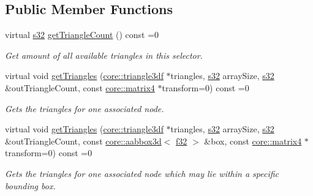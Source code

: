 \subsection*{Public Member Functions}
\begin{DoxyCompactItemize}
\item 
\mbox{\label{classirr_1_1scene_1_1ITriangleSelector_a0db5d5c5c9df15c41c00db40c692fcc6}} 
virtual \hyperlink{namespaceirr_ac66849b7a6ed16e30ebede579f9b47c6}{s32} \hyperlink{classirr_1_1scene_1_1ITriangleSelector_a0db5d5c5c9df15c41c00db40c692fcc6}{get\+Triangle\+Count} () const =0
\begin{DoxyCompactList}\small\item\em Get amount of all available triangles in this selector. \end{DoxyCompactList}\item 
virtual void \hyperlink{classirr_1_1scene_1_1ITriangleSelector_a63b547218902d57a44357d3a246e5070}{get\+Triangles} (\hyperlink{namespaceirr_1_1core_a1112835405bbec5dadf031dc7934e7d0}{core\+::triangle3df} $\ast$triangles, \hyperlink{namespaceirr_ac66849b7a6ed16e30ebede579f9b47c6}{s32} array\+Size, \hyperlink{namespaceirr_ac66849b7a6ed16e30ebede579f9b47c6}{s32} \&out\+Triangle\+Count, const \hyperlink{namespaceirr_1_1core_a73fa92e638c5ca97efd72da307cc9b65}{core\+::matrix4} $\ast$transform=0) const =0
\begin{DoxyCompactList}\small\item\em Gets the triangles for one associated node. \end{DoxyCompactList}\item 
virtual void \hyperlink{classirr_1_1scene_1_1ITriangleSelector_aa0bd1a2f9b429fcf7ff2ce4d6c7acd50}{get\+Triangles} (\hyperlink{namespaceirr_1_1core_a1112835405bbec5dadf031dc7934e7d0}{core\+::triangle3df} $\ast$triangles, \hyperlink{namespaceirr_ac66849b7a6ed16e30ebede579f9b47c6}{s32} array\+Size, \hyperlink{namespaceirr_ac66849b7a6ed16e30ebede579f9b47c6}{s32} \&out\+Triangle\+Count, const \hyperlink{classirr_1_1core_1_1aabbox3d}{core\+::aabbox3d}$<$ \hyperlink{namespaceirr_a0277be98d67dc26ff93b1a6a1d086b07}{f32} $>$ \&box, const \hyperlink{namespaceirr_1_1core_a73fa92e638c5ca97efd72da307cc9b65}{core\+::matrix4} $\ast$transform=0) const =0
\begin{DoxyCompactList}\small\item\em Gets the triangles for one associated node which may lie within a specific bounding box. \end{DoxyCompactList}\item 

\end{DoxyCompactItemize}
